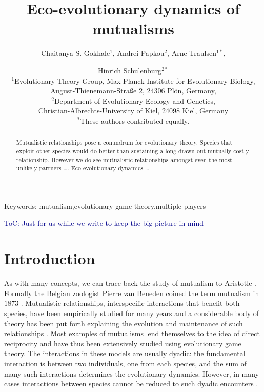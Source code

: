 \documentclass[12pt]{article}
\title{\vspace*{-22mm}\bf Eco-evolutionary dynamics of mutualisms}
\author{Chaitanya S. Gokhale$^{1}$,
Andrei Papkou$^{2}$,
 Arne Traulsen$^{1*}$,
 \and Hinrich Schulenburg$^{2*}$ \\
\normalsize $^{1}$Evolutionary Theory Group,
Max-Planck-Institute for Evolutionary Biology, \\
\normalsize August-Thienemann-Stra{\ss}e 2, 24306 Pl\"{o}n, Germany,\\
\normalsize $^2$Department of Evolutionary Ecology and Genetics, \\
\normalsize Christian-Albrechts-University of Kiel, 24098 Kiel, Germany\\
\normalsize $^*$These authors contributed equally.
}
\date{}
\newcommand{\cha}[1]{\textcolor{darkblue}{#1}}
\begin{document}
\linenumbers
\maketitle

\begin{abstract}
Mutualistic relationships pose a conundrum for evolutionary theory.
Species that exploit other species would do better than sustaining a long drawn out mutually costly relationship. However we do see mutualistic relationships amongst even the most unlikely partners \ldots.
Eco-evolutionary dynamics \ldots
\end{abstract}

\noindent
Keywords: mutualism,evolutionary game theory,multiple players

\tableofcontents

\cha{ToC: Just for us while we write to keep the big picture in mind}

\section{Introduction}

As with many concepts, we can trace back the study of mutualism to Aristotle \citep{aristotle:book:350}.
Formally the Belgian zoologist Pierre van Beneden coined the term mutualism in $1873$ \citep{bronstein:book:2003}.
Mutualistic relationships, interspecific interactions that benefit both species, have been empirically studied for many years 
\citep{boucher:book:1985,hinton:PTENHS:1951,wilson:AmNat:1983,bronstein:QRB:1994,pierce:ARE:2002,kiers:Nature:2003,bshary:ASB:2004} and a considerable body of theory has been put forth explaining the evolution and maintenance of such relationships \citep{poulin:JTB:1995,doebeli:PNAS:1998,noe:book:2001,johnstone:ECL:2002,bergstrom:PNAS:2003,hoeksema:AmNat:2003,akcay:PRSB:2007,bshary:Nature:2008}.
Most examples of mutualisms lend themselves to the idea of direct reciprocity \citep{trivers:QRB:1971} and have thus been extensively studied using evolutionary game theory.
The interactions in these models are usually dyadic: the fundamental interaction is between two individuals, one from each species, and the sum of many such interactions determines the evolutionary dynamics.
However, in many cases interactions between species cannot be reduced to such dyadic encounters \citep{stadler:book:2008}.
\end{document}
